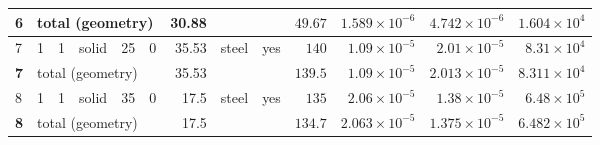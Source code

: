 \documentclass[10pt,a4paper]{article}
\numberwithin{equation}{section}
\begin{document}
\begin{longtable}{llllrrrlcrrrr}
\midrule \textbf{6} & \multicolumn{5}{l}{total (geometry)} & 30.88 & & & $49.67$ & $1.589\times10^{-6}$ & $4.742\times10^{-6}$ & $1.604\times10^{4}$ \\ \midrule
7 & 1 & 1 & solid & 25 & 0 & 35.53 & steel & yes & $140$ & $1.09\times10^{-5}$ & $2.01\times10^{-5}$ & $8.31\times10^{4}$ \\
\midrule \textbf{7} & \multicolumn{5}{l}{total (geometry)} & 35.53 & & & $139.5$ & $1.09\times10^{-5}$ & $2.013\times10^{-5}$ & $8.311\times10^{4}$ \\ \midrule
8 & 1 & 1 & solid & 35 & 0 & 17.5 & steel & yes & $135$ & $2.06\times10^{-5}$ & $1.38\times10^{-5}$ & $6.48\times10^{5}$ \\
\midrule \textbf{8} & \multicolumn{5}{l}{total (geometry)} & 17.5 & & & $134.7$ & $2.063\times10^{-5}$ & $1.375\times10^{-5}$ & $6.482\times10^{5}$ \\ \midrule
\bottomrule\end{longtable}
\endgroup
\begingroup\footnotesize\setlength{\tabcolsep}{3.2pt}
\end{document}
